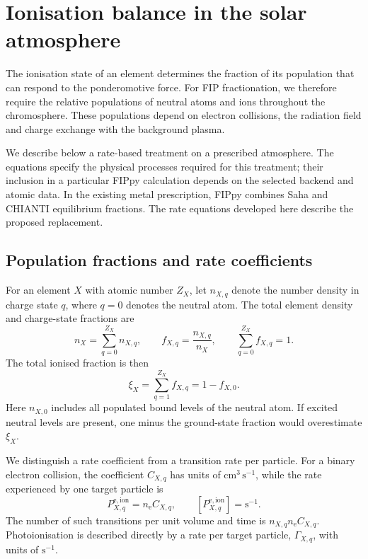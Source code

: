 \section{Ionisation balance in the solar atmosphere}
\label{sec:ionisation_physics}

The ionisation state of an element determines the fraction of its population
that can respond to the ponderomotive force. For FIP fractionation, we therefore
require the relative populations of neutral atoms and ions throughout the
chromosphere. These populations depend on electron collisions, the radiation
field and charge exchange with the background plasma.

We describe below a rate-based treatment on a prescribed atmosphere. The
equations specify the physical processes required for this treatment; their
inclusion in a particular FIPpy calculation depends on the selected backend
and atomic data. In the existing metal prescription, FIPpy combines Saha and
CHIANTI equilibrium fractions. The rate equations developed here describe the
proposed replacement.

\subsection{Population fractions and rate coefficients}
\label{subsec:population_definitions}

For an element \(X\) with atomic number \(Z_X\), let \(n_{X,q}\) denote the
number density in charge state \(q\), where \(q=0\) denotes the neutral atom.
The total element density and charge-state fractions are
\begin{equation}
 n_X=\sum_{q=0}^{Z_X}n_{X,q},
 \qquad
 f_{X,q}=\frac{n_{X,q}}{n_X},
 \qquad
 \sum_{q=0}^{Z_X}f_{X,q}=1.
 \label{eq:ion_population_definitions}
\end{equation}
The total ionised fraction is then
\begin{equation}
 \xi_X=\sum_{q=1}^{Z_X}f_{X,q}=1-f_{X,0}.
 \label{eq:ion_total_fraction}
\end{equation}
Here \(n_{X,0}\) includes all populated bound levels of the neutral atom.
If excited neutral levels are present, one minus the ground-state fraction
would overestimate \(\xi_X\).

We distinguish a rate coefficient from a transition rate per particle.
For a binary electron collision, the coefficient \(C_{X,q}\) has units of
\(\mathrm{cm^3\,s^{-1}}\), while the rate experienced by one target particle is
\begin{equation}
 P_{X,q}^{\mathrm{e,ion}}=n_{\mathrm e}C_{X,q},
 \qquad
 [P_{X,q}^{\mathrm{e,ion}}]=\mathrm{s^{-1}}.
 \label{eq:ion_coefficient_rate}
\end{equation}
The number of such transitions per unit volume and time is
\(n_{X,q}n_{\mathrm e}C_{X,q}\).
Photoionisation is described directly by a rate per target particle,
\(\Gamma_{X,q}\), with units of \(\mathrm{s^{-1}}\).

